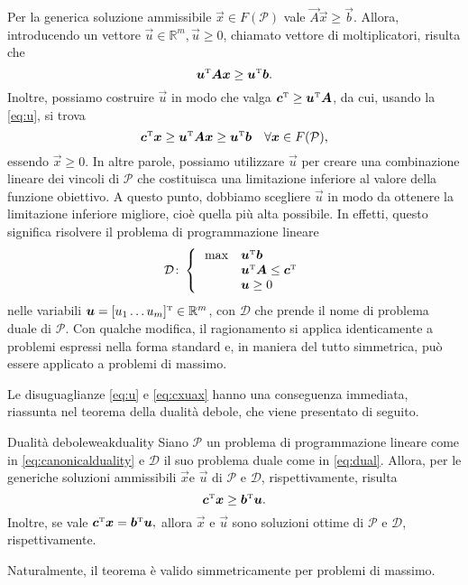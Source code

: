 Per la generica soluzione ammissibile \( \vec{x} \in F(\mathcal{P}) \) vale \( \vec{A}\vec{x} \geq \vec{b} \). Allora,
introducendo un vettore \( \vec{u} \in \mathbb{R}^m, \vec{u} \geq 0 \), chiamato vettore di moltiplicatori, risulta che
\begin{equation}\label{eq:u}
    \bm{u}^{\scriptscriptstyle\mathrm{T}}\bm{A}\bm{x} \geq \bm{u}^{\scriptscriptstyle\mathrm{T}}\bm{b}.
\end{equation}
Inoltre, possiamo costruire \( \vec{u} \) in modo che valga \( \bm{c}^{\scriptscriptstyle\mathrm{T}} \geq \bm{u}^{\scriptscriptstyle\mathrm{T}} \bm{A} \), da cui,
usando la \eqref{eq:u}, si trova
\begin{equation}\label{eq:cxuax}
    \bm{c}^{\scriptscriptstyle\mathrm{T}}\bm{x} \geq \bm{u}^{\scriptscriptstyle\mathrm{T}}\bm{A}\bm{x} \geq \bm{u}^{\scriptscriptstyle\mathrm{T}}\bm{b} \quad \forall \bm{x} \in
    F(\mathcal{P}),
\end{equation}
essendo \( \vec{x} \geq 0 \). In altre parole, possiamo utilizzare \( \vec{u} \) per creare una combinazione lineare dei
vincoli di \( \mathcal{P} \) che costituisca una limitazione inferiore al valore della funzione obiettivo. A questo
punto, dobbiamo scegliere \( \vec{u} \) in modo da ottenere la limitazione inferiore migliore, cioè quella più alta
possibile. In effetti, questo significa risolvere il problema di programmazione lineare
\begin{equation}\label{eq:dual}
    \mathcal{D}\colon\left\{
    \begin{array}{ll}
        \,\max & \bm{u}^{\scriptscriptstyle\mathrm{T}} \bm{b} \\
               & \bm{u}^{\scriptscriptstyle\mathrm{T}}\bm{A} \le \bm{c}^{\scriptscriptstyle\mathrm{T}} \\
             & \bm{u} \ge 0
    \end{array}\right. \\[7pt]
\end{equation}
nelle variabili \( \bm{u} = [u_1 \ldots u_m]^{\scriptscriptstyle\mathrm{T}} \in \mathbb{R}^m \), con \( \mathcal{D} \) che prende il nome di
problema duale di \( \mathcal{P} \).
Con qualche modifica, il ragionamento si applica identicamente a problemi espressi nella forma standard e, in maniera del
tutto simmetrica, può essere applicato a problemi di massimo.

Le disuguaglianze \eqref{eq:u} e \eqref{eq:cxuax} hanno una conseguenza immediata, riassunta nel teorema della dualità
debole, che viene presentato di seguito.

\begin{theorem}{Dualità debole}{weakduality}
    Siano \( \mathcal{P} \) un problema di programmazione lineare come in \eqref{eq:canonicalduality} e \( \mathcal{D}
    \) il suo problema duale come in \eqref{eq:dual}. Allora, per le generiche soluzioni ammissibili \( \vec{x} \text{
    e } \vec{u} \) di \( \mathcal{P} \) e \( \mathcal{D} \), rispettivamente, risulta
    \[
        \bm{c}^{\scriptscriptstyle\mathrm{T}} \bm{x} \geq \bm{b}^{\scriptscriptstyle\mathrm{T}}\bm{u}.
    \]
    Inoltre, se vale
    \(
        \bm{c}^{\scriptscriptstyle\mathrm{T}} \bm{x} = \bm{b}^{\scriptscriptstyle\mathrm{T}}\bm{u},
    \)
    allora \( \vec{x} \) e \( \vec{u} \) sono soluzioni ottime di \( \mathcal{P} \) e \( \mathcal{D} \),
    rispettivamente.
\end{theorem}
\noindent
Naturalmente, il teorema è valido simmetricamente per problemi di massimo.

